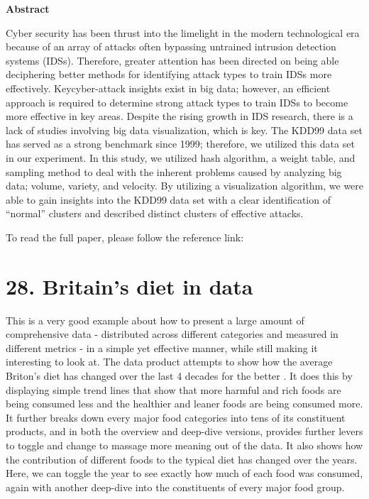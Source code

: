 \documentclass[]{book}
\theoremstyle{definition}
\theoremstyle{definition}
\theoremstyle{definition}
\theoremstyle{remark}
\begin{document}
\textbf{Abstract}

Cyber security has been thrust into the limelight in the modern
technological era because of an array of attacks often bypassing
untrained intrusion detection systems (IDSs). Therefore, greater
attention has been directed on being able deciphering better methods for
identifying attack types to train IDSs more effectively. Keycyber-attack
insights exist in big data; however, an efficient approach is required
to determine strong attack types to train IDSs to become more effective
in key areas. Despite the rising growth in IDS research, there is a lack
of studies involving big data visualization, which is key. The KDD99
data set has served as a strong benchmark since 1999; therefore, we
utilized this data set in our experiment. In this study, we utilized
hash algorithm, a weight table, and sampling method to deal with the
inherent problems caused by analyzing big data; volume, variety, and
velocity. By utilizing a visualization algorithm, we were able to gain
insights into the KDD99 data set with a clear identification of
``normal'' clusters and described distinct clusters of effective
attacks.

To read the full paper, please follow the reference link: \citep{KDD99}

\section{28. Britain's diet in data}\label{britains-diet-in-data}

This is a very good example about how to present a large amount of
comprehensive data - distributed across different categories and
measured in different metrics - in a simple yet effective manner, while
still making it interesting to look at. The data product attempts to
show how the average Briton's diet has changed over the last 4 decades
for the better \citep{britain_diet_2016}. It does this by displaying
simple trend lines that show that more harmful and rich foods are being
consumed less and the healthier and leaner foods are being consumed
more. It further breaks down every major food categories into tens of
its constituent products, and in both the overview and deep-dive
versions, provides further levers to toggle and change to massage more
meaning out of the data. It also shows how the contribution of different
foods to the typical diet has changed over the years. Here, we can
toggle the year to see exactly how much of each food was consumed, again
with another deep-dive into the constituents of every major food group.
\end{document}
